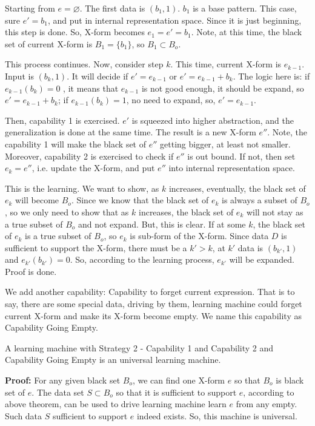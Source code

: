 Starting from $e = \varnothing$. The first data is $(b_1, 1)$. $b_1$ is a base pattern. This case, sure $e' = b_1$, and put in internal representation space. Since it is just beginning, this step is done. So, X-form becomes $e_1 = e' = b_1$. Note, at this time, the black set of current X-form is $B_1 = \{b_1\}$, so $B_1 \subset B_o$. 

This process continues. Now, consider step $k$. This time, current X-form is $e_{k-1}$. Input is $(b_k, 1)$. It will decide if $e' = e_{k-1}$ or $e' = e_{k-1} + b_k$. The logic here is: if $e_{k-1}(b_k) = 0$ , it means that $e_{k-1}$ is not good enough, it should be expand, so $e' = e_{k-1} + b_k$; if $e_{k-1}(b_k) = 1$, no need to expand, so, $e' = e_{k-1}$. 

Then, capability 1 is exercised. $e'$ is squeezed into higher abstraction, and the generalization is done at the same time. The result is a new X-form $e''$. Note, the capability 1 will make the black set of $e''$ getting bigger, at least not smaller. Moreover, capability 2 is exercised to check if $e''$ is out bound. If not, then set $e_k = e''$, i.e. update the X-form, and put $e''$ into internal representation space. 

This is the learning. We want to show, as $k$ increases, eventually, the black set of $e_k$ will become $B_o$. Since we know that the black set of $e_k$ is always a subset of $B_o$, so we only need to show that as $k$ increases, the black set of $e_k$ will not stay as a true subset of $B_o$ and not expand. But, this is clear. If at some $k$, the black set of $e_k$ is a true subset of $B_o$, so $e_k$ is sub-form of the X-form. Since data $D$ is sufficient to support the X-form, there must be a $k' > k$, at $k'$ data is $(b_{k'}, 1)$ and $e_{k'}(b_{k'}) = 0$. So, according to the learning process, $e_{k'}$ will be expanded. Proof is done.
\bigskip

We add another capability: Capability to forget current expression. That is to say, there are some special data, driving by them, learning machine could forget current X-form and make its X-form become empty. We name this capability as Capability Going Empty.


\begin{corollary}
A learning machine with Strategy 2 - Capability 1 and Capability 2 and Capability Going Empty is an universal learning machine.
\end{corollary}
{\bf Proof:} For any given black set $B_o$, we can find one X-form $e$ so that $B_o$ is black set of $e$. The data set $S \subset B_o$ so that it is sufficient to support $e$, according to above theorem, can be used to drive learning machine learn $e$ from any empty. Such data $S$ sufficient to support $e$ indeed exists. So, this machine is universal.
\bigskip





